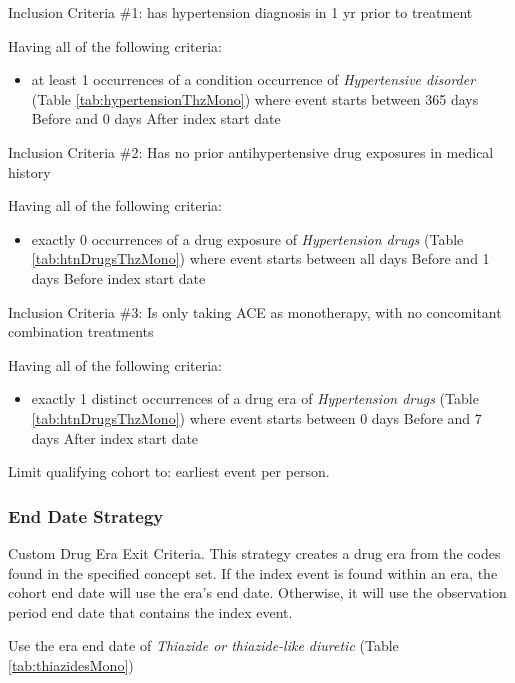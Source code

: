 \documentclass[10.5pt]{book}
\providecommand{\tightlist}{%
  \setlength{\itemsep}{0pt}\setlength{\parskip}{0pt}}
\theoremstyle{definition}
\theoremstyle{definition}
\theoremstyle{definition}
\theoremstyle{remark}
\begin{document}
Inclusion Criteria \#1: has hypertension diagnosis in 1 yr prior to
treatment

Having all of the following criteria:

\begin{itemize}
\tightlist
\item
  at least 1 occurrences of a condition occurrence of \emph{Hypertensive
  disorder} (Table \ref{tab:hypertensionThzMono}) where event starts
  between 365 days Before and 0 days After index start date
\end{itemize}

Inclusion Criteria \#2: Has no prior antihypertensive drug exposures in
medical history

Having all of the following criteria:

\begin{itemize}
\tightlist
\item
  exactly 0 occurrences of a drug exposure of \emph{Hypertension drugs}
  (Table \ref{tab:htnDrugsThzMono}) where event starts between all days
  Before and 1 days Before index start date
\end{itemize}

Inclusion Criteria \#3: Is only taking ACE as monotherapy, with no
concomitant combination treatments

Having all of the following criteria:

\begin{itemize}
\tightlist
\item
  exactly 1 distinct occurrences of a drug era of \emph{Hypertension
  drugs} (Table \ref{tab:htnDrugsThzMono}) where event starts between 0
  days Before and 7 days After index start date
\end{itemize}

Limit qualifying cohort to: earliest event per person.

\subsubsection*{End Date Strategy}\label{end-date-strategy-4}

Custom Drug Era Exit Criteria. This strategy creates a drug era from the
codes found in the specified concept set. If the index event is found
within an era, the cohort end date will use the era's end date.
Otherwise, it will use the observation period end date that contains the
index event.

Use the era end date of \emph{Thiazide or thiazide-like diuretic} (Table
\ref{tab:thiazidesMono})
\end{document}
